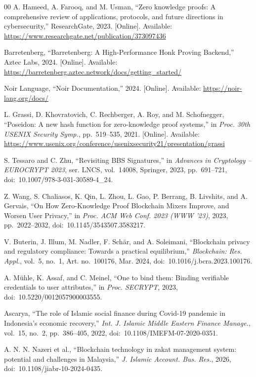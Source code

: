 \documentclass[conference]{IEEEtran}
\begin{document}
\begin{thebibliography}{00}
A. Hameed, A. Farooq, and M. Usman, ``Zero knowledge proofs: A comprehensive review of applications, protocols, and future directions in cybersecurity,'' ResearchGate, 2023. [Online]. Available: \url{https://www.researchgate.net/publication/373097436}

Barretenberg, ``Barretenberg: A High-Performance Honk Proving Backend,'' Aztec Labs, 2024. [Online]. Available: \url{https://barretenberg.aztec.network/docs/getting_started/}

Noir Language, ``Noir Documentation,'' 2024. [Online]. Available: \url{https://noir-lang.org/docs/}

L. Grassi, D. Khovratovich, C. Rechberger, A. Roy, and M. Schofnegger, ``Poseidon: A new hash function for zero-knowledge proof systems,'' in \textit{Proc. 30th USENIX Security Symp.}, pp.~519--535, 2021. [Online]. Available: \url{https://www.usenix.org/conference/usenixsecurity21/presentation/grassi}

S. Tessaro and C. Zhu, ``Revisiting BBS Signatures,'' in \textit{Advances in Cryptology -- EUROCRYPT 2023}, ser. LNCS, vol.~14008, Springer, 2023, pp.~691--721, doi:~10.1007/978-3-031-30589-4\_24.

Z. Wang, S. Chaliasos, K. Qin, L. Zhou, L. Gao, P. Berrang, B. Livshits, and A. Gervais, ``On How Zero-Knowledge Proof Blockchain Mixers Improve, and Worsen User Privacy,'' in \textit{Proc. ACM Web Conf. 2023 (WWW '23)}, 2023, pp.~2022--2032, doi:~10.1145/3543507.3583217.

V. Buterin, J. Illum, M. Nadler, F. Sch\"{a}r, and A. Soleimani, ``Blockchain privacy and regulatory compliance: Towards a practical equilibrium,'' \textit{Blockchain: Res. Appl.}, vol.~5, no.~1, Art. no.~100176, Mar. 2024, doi:~10.1016/j.bcra.2023.100176.

A. M\"{u}hle, K. Assaf, and C. Meinel, ``One to bind them: Binding verifiable credentials to user attributes,'' in \textit{Proc. SECRYPT}, 2023, doi:~10.5220/0012057900003555.

Ascarya, ``The role of Islamic social finance during Covid-19 pandemic in Indonesia's economic recovery,'' \textit{Int. J. Islamic Middle Eastern Finance Manage.}, vol.~15, no.~2, pp.~386--405, 2022, doi:~10.1108/IMEFM-07-2020-0351.

A. N. N. Nazeri et al., ``Blockchain technology in zakat management system: potential and challenges in Malaysia,'' \textit{J. Islamic Account. Bus. Res.}, 2026, doi:~10.1108/jiabr-10-2024-0435.


\end{thebibliography}
\end{document}

